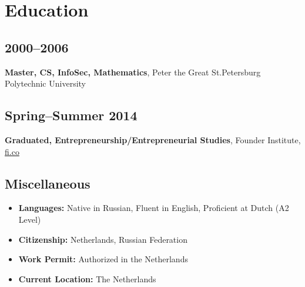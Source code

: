 \section*{Education}

\subsection*{2000--2006}
\textbf{Master, CS, InfoSec, Mathematics}, Peter the Great St.Petersburg Polytechnic University

\subsection*{Spring--Summer 2014}
\textbf{Graduated, Entrepreneurship/Entrepreneurial Studies}, Founder Institute, \href{https://fi.co}{\url{fi.co}}

\subsection*{Miscellaneous}
\begin{itemize}[noitemsep, nosep]
  \item \textbf{Languages:} Native in Russian, Fluent in English, Proficient at Dutch (A2 Level)
  \item \textbf{Citizenship:} Netherlands, Russian Federation
  \item \textbf{Work Permit:} Authorized in the Netherlands
  \item \textbf{Current Location:} The Netherlands
\end{itemize}
